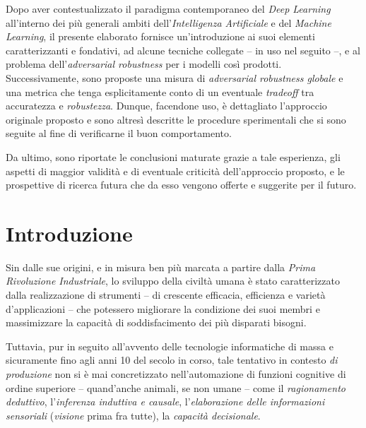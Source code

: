 \documentclass[a4paper, twoside]{article}
\begin{document}
Dopo aver contestualizzato il paradigma contemporaneo del \textit{Deep Learning} all'interno dei più generali ambiti dell'\textit{Intelligenza Artificiale} e del \textit{Machine Learning}, il presente elaborato fornisce un'introduzione ai suoi elementi caratterizzanti e fondativi, ad alcune tecniche collegate -- in uso nel seguito --, e al problema dell'\textit{adversarial robustness} per i modelli così prodotti.\\
Successivamente, sono proposte una misura di \textit{adversarial robustness globale} e una metrica che tenga esplicitamente conto di un eventuale \textit{tradeoff} tra accuratezza e \textit{robustezza}. Dunque, facendone uso, è dettagliato l'approccio originale proposto e sono altresì descritte le procedure sperimentali che si sono seguite al fine di verificarne il buon comportamento.

Da ultimo, sono riportate le conclusioni maturate grazie a tale esperienza, gli aspetti di maggior validità e di eventuale criticità dell'approccio proposto, e le prospettive di ricerca futura che da esso vengono offerte e suggerite per il futuro.



\newpage
\section{Introduzione}

Sin dalle sue origini, e in misura ben più marcata a partire dalla \textit{Prima Rivoluzione Industriale}, lo sviluppo della civiltà umana è stato caratterizzato dalla realizzazione di strumenti -- di crescente efficacia, efficienza e varietà d'applicazioni -- che potessero migliorare la condizione dei suoi membri e massimizzare la capacità di soddisfacimento dei più disparati bisogni.

Tuttavia, pur in seguito all'avvento delle tecnologie informatiche di massa e sicuramente fino agli anni 10 del secolo in corso, tale tentativo in contesto \textit{di produzione} non si è mai concretizzato nell'automazione di funzioni cognitive di ordine superiore -- quand'anche animali, se non umane -- come il \textit{ragionamento deduttivo}, l'\textit{inferenza induttiva e causale}, l'\textit{elaborazione delle informazioni sensoriali} (\textit{visione} prima fra tutte), la \textit{capacità decisionale}.
\end{document}
